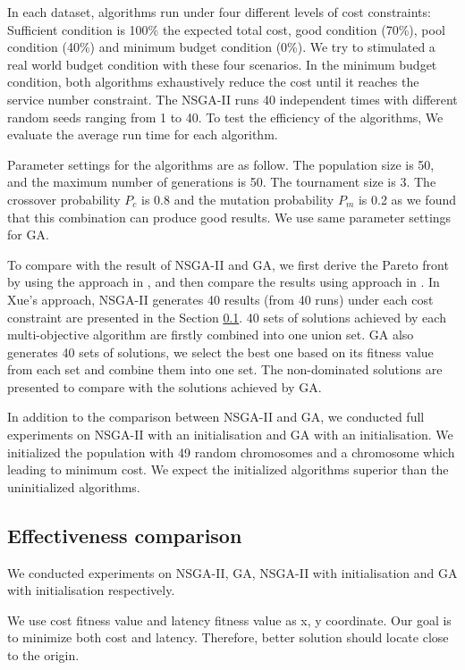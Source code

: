 \documentclass{llncs}
\begin{document}
In each dataset, algorithms run under four different levels of cost constraints: Sufficient condition is 100\% the expected total cost, 
good condition (70\%), pool condition (40\%) and minimum budget condition (0\%). We try to stimulated a real world budget condition with these four 
scenarios. In the minimum budget condition, 
both algorithms exhaustively reduce the cost until it reaches the service number constraint. The NSGA-II runs 40 independent times with different random 
seeds ranging from 1 to 40. To test the efficiency of the algorithms, We evaluate the average run time for each algorithm. 


Parameter settings for the algorithms are as follow. The population size is 50, and the maximum number of 
generations is 50. The tournament size is 3. 
The crossover probability $P_{c}$ is 0.8 and the mutation probability $P_{m}$ 
is 0.2 as we found that this combination can produce good results. We use same parameter settings for GA. 

To compare with the result of NSGA-II and GA, we first derive the Pareto front by using the approach in \cite{Xue} \cite{6381531}, and then compare the results using approach in \cite{1688438}.
In Xue's approach, NSGA-II generates 40 results (from 40 runs) under each cost constraint 
are presented in the Section \ref{sec:comparison}. 40 sets of solutions 
achieved by each multi-objective algorithm are firstly combined into one union set. GA also generates 40 sets of 
solutions, we select the best one based on its fitness value from each set and combine them into one set. 
The non-dominated solutions are presented to compare with the solutions achieved by GA.

In addition to the comparison between NSGA-II and GA, we conducted full experiments on NSGA-II with an initialisation and GA with an initialisation.
We initialized the population with 49 random chromosomes and a chromosome which leading to minimum cost. We expect the initialized algorithms superior than
the uninitialized algorithms.

\subsection{Effectiveness comparison}
\label{sec:comparison}
We conducted experiments on NSGA-II, GA, NSGA-II with initialisation and GA with initialisation respectively.

We use cost fitness value and latency fitness value as 
x, y coordinate. Our goal is to minimize both cost and latency. Therefore, better solution should locate close to the origin.
\end{document}
